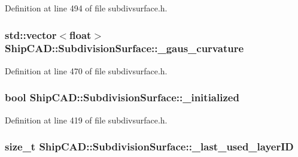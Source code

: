 Definition at line 494 of file subdivsurface.\+h.

\subsubsection[{\texorpdfstring{\+\_\+gaus\+\_\+curvature}{_gaus_curvature}}]{\setlength{\rightskip}{0pt plus 5cm}std\+::vector$<$float$>$ Ship\+C\+A\+D\+::\+Subdivision\+Surface\+::\+\_\+gaus\+\_\+curvature\hspace{0.3cm}{\ttfamily [protected]}}\hypertarget{classShipCAD_1_1SubdivisionSurface_a20cbcc689f7b2f8af21f502748521185}{}\label{classShipCAD_1_1SubdivisionSurface_a20cbcc689f7b2f8af21f502748521185}


Definition at line 470 of file subdivsurface.\+h.

\subsubsection[{\texorpdfstring{\+\_\+initialized}{_initialized}}]{\setlength{\rightskip}{0pt plus 5cm}bool Ship\+C\+A\+D\+::\+Subdivision\+Surface\+::\+\_\+initialized\hspace{0.3cm}{\ttfamily [protected]}}\hypertarget{classShipCAD_1_1SubdivisionSurface_a828f85ee49e1481e95f61b919070842c}{}\label{classShipCAD_1_1SubdivisionSurface_a828f85ee49e1481e95f61b919070842c}


Definition at line 419 of file subdivsurface.\+h.

\subsubsection[{\texorpdfstring{\+\_\+last\+\_\+used\+\_\+layer\+ID}{_last_used_layerID}}]{\setlength{\rightskip}{0pt plus 5cm}size\+\_\+t Ship\+C\+A\+D\+::\+Subdivision\+Surface\+::\+\_\+last\+\_\+used\+\_\+layer\+ID\hspace{0.3cm}{\ttfamily [protected]}}\hypertarget{classShipCAD_1_1SubdivisionSurface_a0ba5c4e08110400890eb60140f3e2058}{}\label{classShipCAD_1_1SubdivisionSurface_a0ba5c4e08110400890eb60140f3e2058}


